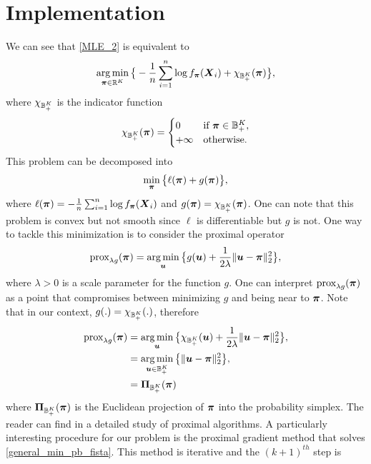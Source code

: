 \section{Implementation}
We can see that \cref{MLE_2} is equivalent to
\begin{equation}
\operatorname*{arg\,min}_{\boldsymbol \pi\in{\mathbb R}^K}\big\{-\frac{1}{n}\sum_{i=1}^n\log f_{\boldsymbol \pi}(\boldsymbol X_i)+\chi_{{\mathbb B}_+^K}(\boldsymbol \pi)\big\},
\end{equation}
where $\chi_{{\mathbb B}_+^K}$ is the indicator function
\begin{equation*}
    \chi_{{\mathbb B}_+^K}(\boldsymbol \pi) =
    \begin{cases}
      0 & \text{if } \boldsymbol \pi\in {\mathbb B}_+^K,\\
      +\infty & \text{otherwise} .
    \end{cases}
\end{equation*}
This problem can be decomposed into 
\begin{equation}
\label{general_min_pb_fista}
    \min_{\boldsymbol \pi}\big\{\ell(\boldsymbol \pi)+g(\boldsymbol \pi)\big\},
\end{equation}
where $\ell(\boldsymbol \pi) =-\frac{1}{n}\sum_{i=1}^n\log f_{\boldsymbol \pi}(\boldsymbol X_i)$ and $g(\boldsymbol \pi)=\chi_{{\mathbb B}_+^K}(\boldsymbol \pi)$. One can note that this problem is convex but not smooth since $\ell$ is differentiable but $g$ is not. One way to tackle this minimization is to consider the proximal operator
\begin{equation}
    \textnormal{prox}_{\lambda g}(\boldsymbol \pi) = \operatorname*{arg\,min}_{\boldsymbol u}\big\{g(\boldsymbol u)+\frac{1}{2\lambda}\|\boldsymbol u-\boldsymbol \pi\|^2_2\big\},
\end{equation}
where $\lambda > 0$ is a scale parameter for the function $g$. One can interpret $\textnormal{prox}_{\lambda g}(\boldsymbol \pi)$ as a point that compromises between minimizing $g$ and being near to $\boldsymbol \pi$. Note that in our context, $g(.)=\chi_{{\mathbb B}_+^K}(.)$, therefore
\begin{align*}
    \textnormal{prox}_{\lambda g}(\boldsymbol \pi) &= \operatorname*{arg\,min}_{\boldsymbol u}\big\{\chi_{{\mathbb B}_+^K}(\boldsymbol u)+\frac{1}{2\lambda}\|\boldsymbol u-\boldsymbol \pi\|^2_2\big\},\\
    &= \operatorname*{arg\,min}_{\boldsymbol u\in {\mathbb B}_+^K}\big\{\|\boldsymbol u-\boldsymbol \pi\|^2_2\big\},\\
    &= \boldsymbol\Pi_{{\mathbb B}_+^K}(\boldsymbol \pi)
\end{align*}
where $\boldsymbol\Pi_{{\mathbb B}_+^K}(\boldsymbol \pi)$ is the Euclidean projection of $\boldsymbol \pi$ into the probability simplex. The reader can find in \citep{Parikh:2014:PA:2693612.2693613} a detailed study of proximal algorithms. A particularly interesting procedure for our problem is the proximal gradient method that solves \cref{general_min_pb_fista}. This method is iterative and the $(k+1)^{th}$ step is
